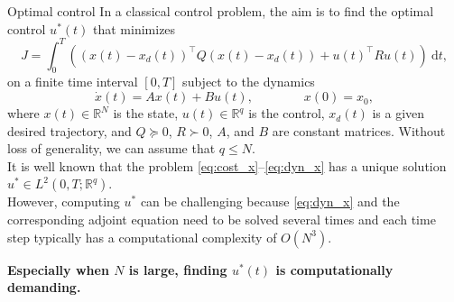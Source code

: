 \documentclass[mathserif]{beamer}
\begin{document}
\begin{frame}
\begin{columns}[T]
\begin{column}{.45\textwidth}
      \begin{block}{Optimal control}
      In a classical control problem, the aim is to find the optimal control $u^*(t)$ that minimizes
      \begin{equation}
      J = \int_0^T \left( (x(t)-x_d(t))^\top Q (x(t)-x_d(t)) + u(t)^\top R u(t) \right) \ \mathrm{d}t, \label{eq:cost_x}
      \end{equation}
      on a finite time interval $[0,T]$ subject to the dynamics
	  \begin{equation}
	  \dot{x}(t) = Ax(t) + Bu(t), \qquad \qquad x(0) = x_0, \label{eq:dyn_x}
	  \end{equation}
      where $x(t) \in \mathbb{R}^N$ is the state, $u(t) \in \mathbb{R}^q$ is the control,  $x_d(t)$ is a given desired trajectory, and $Q \succeq 0$, $R \succ 0$, $A$, and $B$ are constant matrices. Without loss of generality, we can assume that $q \leq N$. 
      \\
      It is well known that the problem \eqref{eq:cost_x}--\eqref{eq:dyn_x} has a unique solution $u^* \in L^2(0,T; \mathbb{R}^q)$. \\
      However, computing $u^*$ can be challenging because \eqref{eq:dyn_x} and the corresponding adjoint equation need to be solved several times and each time step typically has a computational complexity of $O(N^3)$. 
      
\begin{center}
\textbf{Especially when $N$ is large, finding $u^*(t)$ is computationally demanding. } 
\end{center}      
      \end{block}  
      

\end{column}
\end{columns}
\end{frame}
\end{document}
